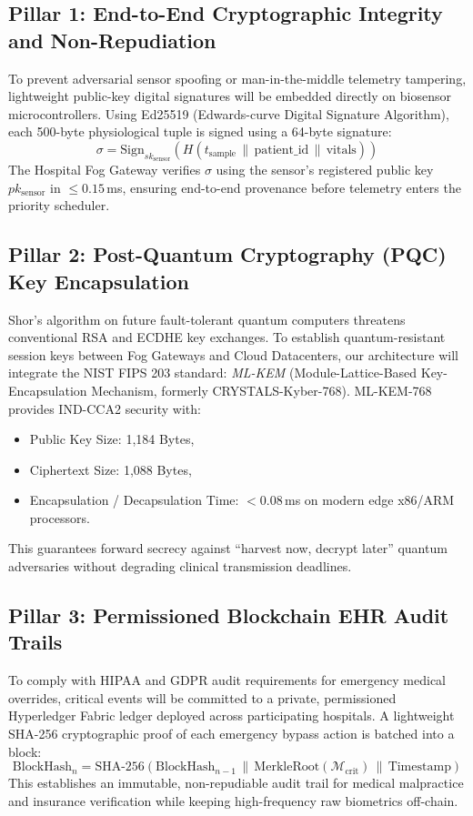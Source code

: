 \documentclass[conference]{IEEEtran}
\begin{document}
\subsection{Pillar 1: End-to-End Cryptographic Integrity and Non-Repudiation}
To prevent adversarial sensor spoofing or man-in-the-middle telemetry tampering, lightweight public-key digital signatures will be embedded directly on biosensor microcontrollers. Using Ed25519 (Edwards-curve Digital Signature Algorithm), each 500-byte physiological tuple is signed using a 64-byte signature:
\begin{equation}
\sigma = \text{Sign}_{sk_{\text{sensor}}}(H(t_{\text{sample}} \,\|\, \text{patient\_id} \,\|\, \text{vitals}))
\end{equation}
The Hospital Fog Gateway verifies $\sigma$ using the sensor's registered public key $pk_{\text{sensor}}$ in $\le 0.15$\,ms, ensuring end-to-end provenance before telemetry enters the priority scheduler.

\subsection{Pillar 2: Post-Quantum Cryptography (PQC) Key Encapsulation}
Shor's algorithm on future fault-tolerant quantum computers threatens conventional RSA and ECDHE key exchanges. To establish quantum-resistant session keys between Fog Gateways and Cloud Datacenters, our architecture will integrate the NIST FIPS 203 standard: \textit{ML-KEM} (Module-Lattice-Based Key-Encapsulation Mechanism, formerly CRYSTALS-Kyber-768). ML-KEM-768 provides IND-CCA2 security with:
\begin{itemize}
    \item Public Key Size: 1,184 Bytes,
    \item Ciphertext Size: 1,088 Bytes,
    \item Encapsulation / Decapsulation Time: $< 0.08$\,ms on modern edge x86/ARM processors.
\end{itemize}
This guarantees forward secrecy against ``harvest now, decrypt later'' quantum adversaries without degrading clinical transmission deadlines.

\subsection{Pillar 3: Permissioned Blockchain EHR Audit Trails}
To comply with HIPAA and GDPR audit requirements for emergency medical overrides, critical events will be committed to a private, permissioned Hyperledger Fabric ledger deployed across participating hospitals. A lightweight SHA-256 cryptographic proof of each emergency bypass action is batched into a block:
\begin{equation}
\text{BlockHash}_n = \text{SHA-256}\left(\text{BlockHash}_{n-1} \,\|\, \text{MerkleRoot}(\mathcal{M}_{\text{crit}}) \,\|\, \text{Timestamp}\right)
\end{equation}
This establishes an immutable, non-repudiable audit trail for medical malpractice and insurance verification while keeping high-frequency raw biometrics off-chain.
\end{document}
